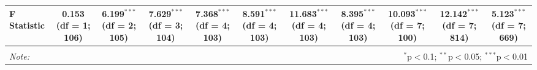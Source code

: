 \begin{tabular}{@{\extracolsep{5pt}}lcccccccccc}
F Statistic & 0.153 (df = 1; 106) & 6.199$^{***}$ (df = 2; 105) & 7.629$^{***}$ (df = 3; 104) & 7.368$^{***}$ (df = 4; 103) & 8.591$^{***}$ (df = 4; 103) & 11.683$^{***}$ (df = 4; 103) & 8.395$^{***}$ (df = 4; 103) & 10.093$^{***}$ (df = 7; 100) & 12.142$^{***}$ (df = 7; 814) & 5.123$^{***}$ (df = 7; 669) \\ 
\hline 
\hline \\[-1.8ex] 
\textit{Note:}  & \multicolumn{10}{r}{$^{*}$p$<$0.1; $^{**}$p$<$0.05; $^{***}$p$<$0.01} \\ 
\end{tabular} 
